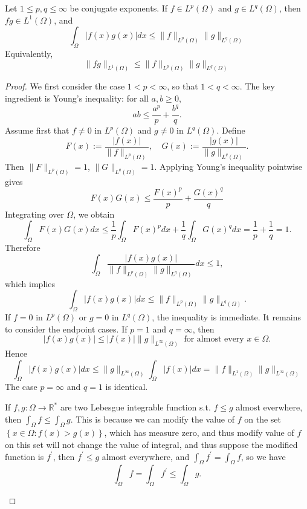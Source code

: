 \begin{theorem}
Let $1 \le p, q \le \infty$ be conjugate exponents. If $f \in L^{p}(\Omega)$ and $g \in L^{q}(\Omega)$, then $fg \in L^{1}(\Omega)$, and
\[ \int_{\Omega} |f(x)g(x)| dx \le \|f\|_{L^{p}(\Omega)} \|g\|_{L^{q}(\Omega)} \]
Equivalently,
\[ \|fg\|_{L^{1}(\Omega)} \le \|f\|_{L^{p}(\Omega)} \|g\|_{L^{q}(\Omega)} \]
\end{theorem}

\begin{proof}
We first consider the case $1 < p < \infty$, so that $1 < q < \infty$. The key ingredient is Young's inequality: for all $a, b \ge 0$,
\[ ab \le \frac{a^{p}}{p} + \frac{b^{q}}{q}. \]
Assume first that $f \ne 0$ in $L^{p}(\Omega)$ and $g \ne 0$ in $L^{q}(\Omega)$. Define
\[ F(x) := \frac{|f(x)|}{\|f\|_{L^{p}(\Omega)}}, \quad G(x) := \frac{|g(x)|}{\|g\|_{L^{q}(\Omega)}}. \]
Then $\|F\|_{L^{p}(\Omega)} = 1$, $\|G\|_{L^{q}(\Omega)} = 1$. Applying Young's inequality pointwise gives
\[ F(x)G(x) \le \frac{F(x)^{p}}{p} + \frac{G(x)^{q}}{q} \]
Integrating over $\Omega$, we obtain
\[ \int_{\Omega} F(x)G(x) dx \le \frac{1}{p} \int_{\Omega} F(x)^{p} dx + \frac{1}{q} \int_{\Omega} G(x)^{q} dx = \frac{1}{p} + \frac{1}{q} = 1. \]
Therefore
\[ \int_{\Omega} \frac{|f(x)g(x)|}{\|f\|_{L^{p}(\Omega)} \|g\|_{L^{q}(\Omega)}} dx \le 1, \]
which implies
\[ \int_{\Omega} |f(x)g(x)| dx \le \|f\|_{L^{p}(\Omega)} \|g\|_{L^{q}(\Omega)}. \]
If $f = 0$ in $L^{p}(\Omega)$ or $g = 0$ in $L^{q}(\Omega)$, the inequality is immediate. It remains to consider the endpoint cases. If $p = 1$ and $q = \infty$, then
\[ |f(x)g(x)| \le |f(x)| \|g\|_{L^{\infty}(\Omega)} \text{ for almost every } x \in \Omega. \]
Hence
\[ \int_{\Omega} |f(x)g(x)| dx \le \|g\|_{L^{\infty}(\Omega)} \int_{\Omega} |f(x)| dx = \|f\|_{L^{1}(\Omega)} \|g\|_{L^{\infty}(\Omega)} \]
The case $p = \infty$ and $q = 1$ is identical.

\begin{remark}
    If \(f, g: \Omega \to \mathbb{R}^*\) are two Lebesgue integrable function s.t. \(f \le g\) almost everwhere, then \(\int_\Omega f \le \int_\Omega  g\). This is because we can modify the value of \(f\) on the set \(\left\{ x \in \Omega: f(x) > g(x) \right\} \), which has measure zero, and thus modify value of \(f\) on this set will not change the value of integral, and thus suppose the modified function is \(f^{\prime} \), then \(f^{\prime} \le g\) almost everywhere, and \(\int_\Omega f^{\prime} = \int _\Omega f\), so we have 
    \[
        \int _\Omega f = \int _\Omega f^{\prime} \le \int _\Omega g.
    \]        
\end{remark}
\end{proof}

